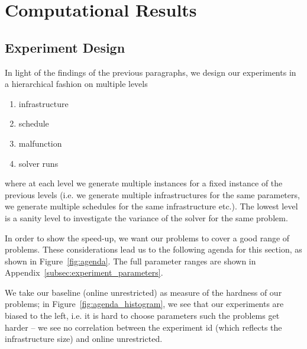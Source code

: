 \documentclass{article}
\begin{document}
\section{Computational Results}\label{sec:Results}




\subsection{Experiment Design}

In light of the findings of the previous paragraphs, we design our experiments in a hierarchical fashion on multiple levels
\begin{enumerate}
    \item infrastructure
    \item schedule
    \item malfunction
    \item solver runs
\end{enumerate}
where at each level we generate multiple instances for a fixed instance of the previous levels (i.e. we generate multiple infrastructures for the same parameters, we generate multiple schedules for the same infrastructure etc.). The lowest level is a sanity level to investigate the variance of the solver for the same problem.

In order to show the speed-up, we want our problems to cover a good range of problems.
These considerations lead us  to the following agenda for this section, as shown in Figure~\ref{fig:agenda}. The full parameter ranges are shown in Appendix~\ref{subsec:experiment_parameters}.
%

We take our  baseline (online unrestricted) as  measure of the hardness of our problems; in Figure~\ref{fig:agenda_histogram}, we see that our experiments are biased to the left, i.e. it is hard to choose parameters such the problems get harder -- we see no correlation between the experiment id (which reflects the infrastructure size) and online unrestricted.
\end{document}
